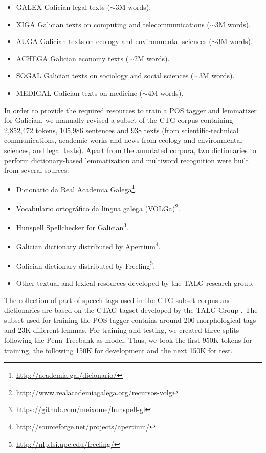 \documentclass[10pt, a4paper]{article}
\begin{document}
\begin{itemize}
\item GALEX Galician legal texts ($\sim$3M words).
\item XIGA Galician texts on computing and telecommunications ($\sim$3M words).
\item AUGA Galician texts on ecology and environmental sciences ($\sim$3M words).
\item ACHEGA Galician economy texts ($\sim$2M words).
\item SOGAL Galician texts on sociology and social sciences ($\sim$3M words).
\item MEDIGAL Galician texts on medicine ($\sim$4M words).
\end{itemize}

In order to provide the required resources to train a POS tagger and lemmatizer for Galician, we manually revised a subset of the CTG corpus containing 2,852,472 tokens, 105,986 sentences and 938 texts (from scientific-technical communications, academic works and news from ecology and environmental sciences, and legal texts). Apart from the annotated corpora, two dictionaries to perform dictionary-based lemmatization and multiword recognition were built from several sources:

\begin{itemize}
\item Dicionario da Real Academia Galega\footnote{\url{http://academia.gal/dicionario/}}.
\item Vocabulario ortogr\'afico da lingua galega (VOLGa)\footnote{\url{http://www.realacademiagalega.org/recursos-volg}}.
\item Hunspell Spellchecker for Galician\footnote{\url{https://github.com/meixome/hunspell-gl}}.
\item Galician dictionary distributed by Apertium\footnote{\url{http://sourceforge.net/projects/apertium/}}.
\item Galician dictionary distributed by Freeling\footnote{\url{http://nlp.lsi.upc.edu/freeling/}}.
\item Other textual and lexical resources developed by the TALG research group.
\end{itemize}

The collection of part-of-speech tags used in the CTG subset corpus and dictionaries are based on the CTAG tagset developed by the TALG Group \cite{LM09}. The subset used for training the POS tagger contains around 200 morphological tags and 23K different lemmas. For training and testing, we created three splits following the Penn Treebank as model. Thus, we took the first 950K tokens for training, the following 150K for development and the next 150K for test.
\end{document}
